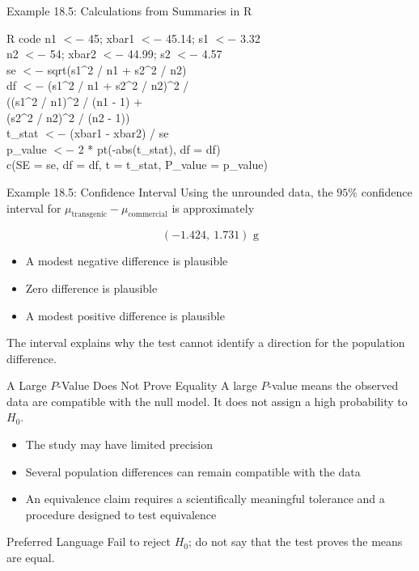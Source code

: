 \documentclass[aspectratio=169,10pt]{beamer}
\begin{document}
\begin{frame}{Example 18.5: Calculations from Summaries in R}
\begin{block}{R code}
\scriptsize\sffamily
n1 $<-$ 45; xbar1 $<-$ 45.14; s1 $<-$ 3.32 \\
n2 $<-$ 54; xbar2 $<-$ 44.99; s2 $<-$ 4.57 \\
\vspace{0.08cm}
se $<-$ sqrt(s1\^{}2 / n1 + s2\^{}2 / n2) \\
df $<-$ (s1\^{}2 / n1 + s2\^{}2 / n2)\^{}2 / \\
\hspace*{0.7cm}((s1\^{}2 / n1)\^{}2 / (n1 - 1) + \\
\hspace*{0.9cm}(s2\^{}2 / n2)\^{}2 / (n2 - 1)) \\
\vspace{0.08cm}
t\_stat $<-$ (xbar1 - xbar2) / se \\
p\_value $<-$ 2 * pt(-abs(t\_stat), df = df) \\
c(SE = se, df = df, t = t\_stat, P\_value = p\_value)
\end{block}
\end{frame}

\begin{frame}{Example 18.5: Confidence Interval}
Using the unrounded data, the $95\%$ confidence interval for
$\mu_{\text{transgenic}}-\mu_{\text{commercial}}$ is approximately

\[
(-1.424,\ 1.731)\text{ g}
\]

\begin{itemize}
  \item A modest negative difference is plausible
  \item Zero difference is plausible
  \item A modest positive difference is plausible
\end{itemize}

The interval explains why the test cannot identify a direction for the population difference.
\end{frame}

\begin{frame}{A Large $P$-Value Does Not Prove Equality}
A large $P$-value means the observed data are compatible with the null model. It does not assign a high probability to $H_0$.

\begin{itemize}
  \item The study may have limited precision
  \item Several population differences can remain compatible with the data
  \item An equivalence claim requires a scientifically meaningful tolerance and a procedure designed to test equivalence
\end{itemize}

\begin{block}{Preferred Language}
Fail to reject $H_0$; do not say that the test proves the means are equal.
\end{block}
\end{frame}
\end{document}
